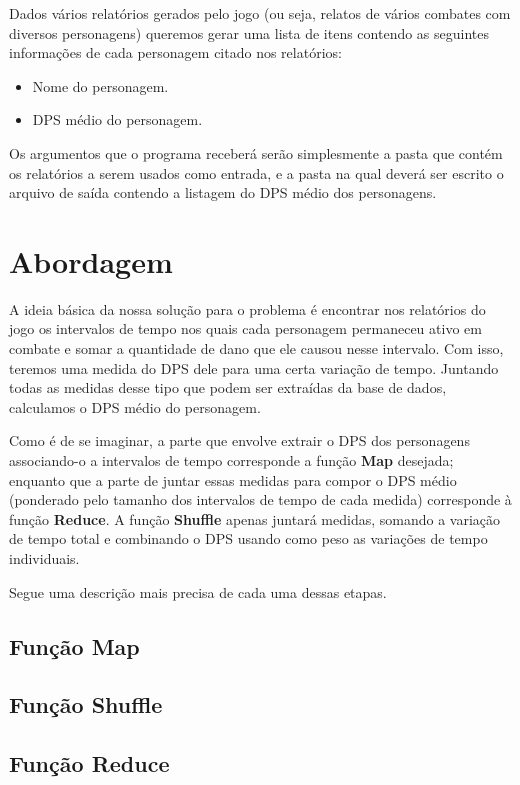 \documentclass[a4paper,11pt]{article}
\begin{document}
  Dados vários relatórios gerados pelo jogo (ou seja, relatos de vários combates
  com diversos personagens) queremos gerar uma lista de itens contendo as
  seguintes informações de cada personagem citado nos relatórios:
  
  \begin{itemize}
  
    \item Nome do personagem.
    \item DPS médio do personagem.
  
  \end{itemize}
  
  Os argumentos que o programa receberá serão simplesmente a pasta que contém os
  relatórios a serem usados como entrada, e a pasta na qual deverá ser escrito o
  arquivo de saída contendo a listagem do DPS médio dos personagens.

\section{Abordagem}

  A ideia básica da nossa solução para o problema é encontrar nos relatórios do
  jogo os intervalos de tempo nos quais cada personagem permaneceu ativo em
  combate e somar a quantidade de dano que ele causou nesse intervalo. Com isso,
  teremos uma medida do DPS dele para uma certa variação de tempo. Juntando
  todas as medidas desse tipo que podem ser extraídas da base de dados,
  calculamos o DPS médio do personagem.
  
  Como é de se imaginar, a parte que envolve extrair o DPS dos personagens
  associando-o a intervalos de tempo corresponde a função \textbf{Map} desejada;
  enquanto que a parte de juntar essas medidas para compor o DPS médio
  (ponderado pelo tamanho dos intervalos de tempo de cada medida) corresponde à
  função \textbf{Reduce}. A função \textbf{Shuffle} apenas juntará medidas,
  somando a variação de tempo total e combinando o DPS usando como peso as
  variações de tempo individuais.
  
  Segue uma descrição mais precisa de cada uma dessas etapas.
  
  \subsection{Função \textbf{Map}}
  
  \subsection{Função \textbf{Shuffle}}
  
  \subsection{Função \textbf{Reduce}}
\end{document}
